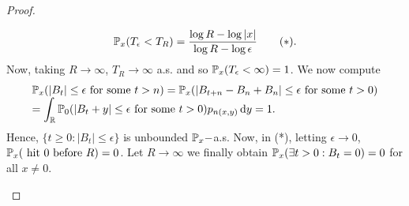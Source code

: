 \documentclass{article}
\begin{document}
\begin{proof}
\begin{enumerate}
{
    }	     		    \[
		    \mathbb{P}_{x}(T_{\epsilon}<T_{R}) = \frac{\log R -\log |x|}{\log R - \log \epsilon} \tag{$\ast$}.
		    \]
		    Now, taking $ R\to \infty$, $ T_{R}\to \infty$ a.s. and so $ \mathbb{P}_{x}(T_{\epsilon}<\infty)=1$. We now compute 
		    \[
		    \begin{array}{ll}
			    \mathbb{P}_{x}(|B_{t}|\leq \epsilon \text{ for some }t>n) = \mathbb{P}_{x}(|B_{t+n}-B_{n}+B_{n}|\leq \epsilon \text{ for some } t>0) \\
		         = \displaystyle\int_{\mathbb{R}} \mathbb{P}_{0}(|B_{t}+y|\leq \epsilon \text{ for some }t>0) p_{n(x,y)}\operatorname{d}\! y = 1.
		    \end{array}
		    \]
		    Hence, $ \{t\geq 0: |B_{t}|\leq \epsilon\}$ is unbounded $ \mathbb{P}_{x}-$a.s. Now, in (*), letting $ \epsilon \to 0$, $ \mathbb{P}_{x}(\text{ hit }0 \text{ before } R)=0$. Let $ R\to \infty$ we finally obtain $ \mathbb{P}_{x}(\exists t>0: B_{t} = 0)=0$ for all $ x\neq 0$.\\ 


\end{enumerate}
\end{proof}
\end{document}
